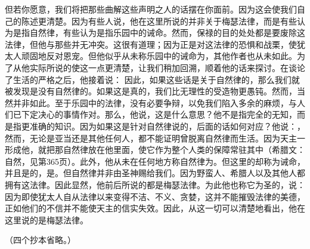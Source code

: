 但若你愿意，我们将把那些曲解这些声明之人的话摆在你面前。因为这会使我们自己的陈述更清楚。因为有些人说，他在这里所说的并非关于梅瑟法律，而是有些认为是指自然律，有些认为是指乐园中的诫命。然而，保禄的目的处处都是要废除这法律，但他与那些并无冲突。这很有道理；因为正是对这法律的恐惧和战栗，使犹太人顽固地反对恩宠。但他似乎从未称乐园中的诫命为，其他作者也从未如此。为了从他实际所说的使这一点更清楚，让我们稍加回溯，顺着他的话来探讨。在谈论了生活的严格之后，他接着说： 因此，如果这些话是关于自然律的，那么我们就被发现是没有自然律的。如果这是真的，我们比无理性的受造物更愚钝。然而，当然并非如此。至于乐园中的法律，没有必要争辩，以免我们陷入多余的麻烦，与人们已下定决心的事情作对。那么，他说，这是什么意思？他不是指完全的无知，而是指更准确的知识。因为如果这是针对自然律说的，后面的话如何对应？他说：， 然而，无论是亚当还是其他任何人，都不能证明曾脱离自然律而生活。因为天主一形成他，就把那自然律放在他里面，使它作为整个人类的保障常驻其中（希腊文：自然，见第365页）。此外，他从未在任何地方称自然律为。但这里的却称为诫命，并且是的，是。但自然律并非由圣神赐给我们。因为野蛮人、希腊人以及其他人都拥有这法律。因此显然，他前后所说的都是梅瑟法律。为此他也称它为圣的，说： 因为即使犹太人自从法律以来变得不洁、不义、贪婪，这并不能摧毁法律的美德，正如他们的不信并不能使天主的信实失效。因此，从这一切可以清楚地看出，他在这里说的是梅瑟法律。\par

 （四个抄本省略。）\par

